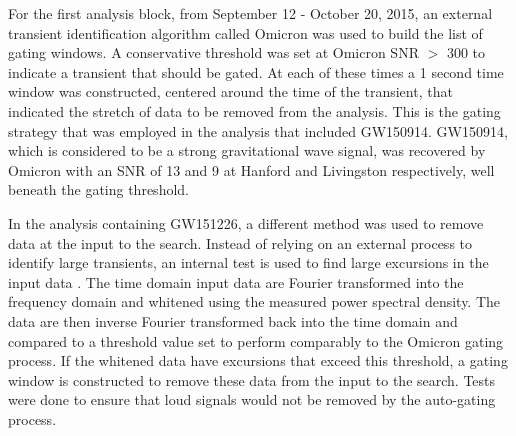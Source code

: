 For the first analysis block, from September 12 - October 20, 2015, an external transient
identification algorithm called Omicron \cite{Robinet:2015om}
was used to build the list of gating windows. A conservative threshold was set at Omicron SNR $>$ 300
to indicate a transient that should be gated. At each of these times a 1 second time window was constructed,
centered around the time of the transient, that indicated the stretch of data to be removed from the analysis.
This is the gating strategy that was employed in the analysis that included GW150914.
GW150914, which is considered to be a strong gravitational wave signal, was recovered by Omicron with an SNR
of 13 and 9 at Hanford and Livingston respectively, well beneath the gating threshold.

In the analysis containing GW151226, a different method was used to remove data at the
input to the search. Instead of relying on an external process to identify large transients,
an internal test is used to find large excursions in the input data \cite{Usman:2015kfa}.
The time domain input
data are Fourier transformed into the frequency domain and whitened using the
measured power spectral density. The data are then inverse Fourier transformed back into
the time domain and compared to a threshold value set to perform comparably to the
Omicron gating process.
If the whitened data have excursions that exceed this threshold, a gating window is
constructed to remove these data from the input to the search.
Tests were done to ensure that loud signals would not be
removed by the auto-gating process.

